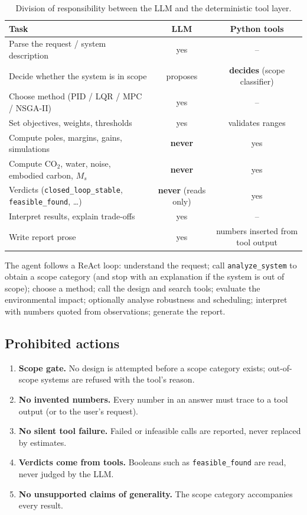 \documentclass[a4paper,11pt]{article}
\begin{document}
\begin{table}[H]
\centering\small
\begin{tabularx}{\textwidth}{@{}Y c c@{}}
\toprule
Task & LLM & Python tools \\
\midrule
Parse the request / system description & yes & -- \\
Decide whether the system is in scope & proposes & \textbf{decides} (scope classifier) \\
Choose method (PID / LQR / MPC / NSGA-II) & yes & -- \\
Set objectives, weights, thresholds & yes & validates ranges \\
Compute poles, margins, gains, simulations & \textbf{never} & yes \\
Compute CO$_2$, water, noise, embodied carbon, $M_s$ & \textbf{never} & yes \\
Verdicts (\texttt{closed\_loop\_stable}, \texttt{feasible\_found}, \dots) & \textbf{never} (reads only) & yes \\
Interpret results, explain trade-offs & yes & -- \\
Write report prose & yes & numbers inserted from tool output \\
\bottomrule
\end{tabularx}
\caption{Division of responsibility between the LLM and the deterministic tool layer.}
\label{tab:division}
\end{table}

The agent follows a ReAct loop: understand the request; call \texttt{analyze\_system} to obtain a scope category (and stop with an explanation if the system is out of scope); choose a method; call the design and search tools; evaluate the environmental impact; optionally analyse robustness and scheduling; interpret with numbers quoted from observations; generate the report.

\subsection{Prohibited actions}
\begin{enumerate}[nosep]
\item \textbf{Scope gate.} No design is attempted before a scope category exists; out-of-scope systems are refused with the tool's reason.
\item \textbf{No invented numbers.} Every number in an answer must trace to a tool output (or to the user's request).
\item \textbf{No silent tool failure.} Failed or infeasible calls are reported, never replaced by estimates.
\item \textbf{Verdicts come from tools.} Booleans such as \texttt{feasible\_found} are read, never judged by the LLM.
\item \textbf{No unsupported claims of generality.} The scope category accompanies every result.
\end{enumerate}
\end{document}
